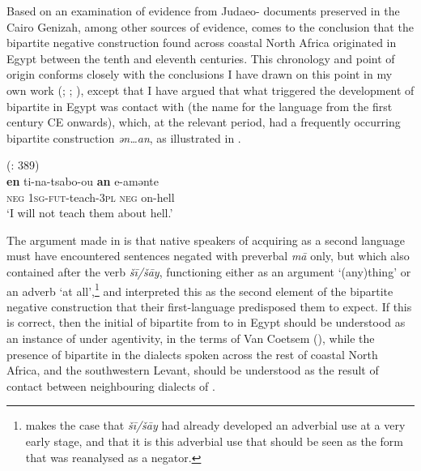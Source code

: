 \documentclass[output=paper]{langsci/langscibook}
\begin{document}
Based on an examination of evidence from Judaeo- documents preserved in the Cairo Genizah, among other sources of evidence, \citet{Diem2014} comes to the conclusion that the  bipartite negative construction found across coastal North Africa originated in Egypt between the tenth and eleventh centuries. This chronology and point of origin conforms closely with the conclusions I have drawn on this point in my own work (\citealt{Lucas2007}; \citeyear{Lucas2009}; \citealt{LucasLash2010}), except that I have argued that what triggered the development of bipartite  in Egypt was contact with  (the name for the  language from the first century CE onwards), which, at the relevant period, had a frequently occurring bipartite construction \textit{ən…an}, as illustrated in .

\ea\label{coptic}
{        (\citealt{LucasLash2010}: 389)}\\
\gll \textbf{en} ti-na-tsabo-ou \textbf{an} e-amənte\\
     \textsc{neg} \textsc{1sg-fut-}teach-\textsc{3pl} \textsc{neg} on-hell\\
\glt ‘I will not teach them about hell.’
\z

The argument made in \citet{LucasLash2010} is that native speakers of  acquiring  as a second language must have encountered sentences negated with preverbal \textit{mā} only, but which also contained after the verb \textit{šī/šāy}, functioning either as an argument ‘(any)thing’ or an adverb ‘at all’,\footnote{\citet{Diem2014} makes the case that \textit{šī/šāy} had already developed an adverbial use at a very early stage, and that it is this adverbial use that should be seen as the form that was reanalysed as a negator.} and interpreted this as the second element of the bipartite negative construction that their first-language  predisposed them to expect. If this is correct, then the initial  of bipartite  from  to  in Egypt should be understood as an instance of  under  agentivity, in the terms of Van Coetsem (\citeyear{VanCoetsem1988,VanCoetsem2000}), while the presence of bipartite  in the dialects spoken across the rest of coastal North Africa, and the southwestern Levant, should be understood as the result of contact between neighbouring dialects of .
\end{document}
